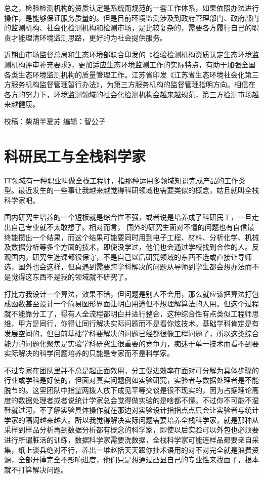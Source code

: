 \documentclass[]{book}
\begin{document}
总之，检验检测机构的资质认定是系统而规范的一套工作体系，如果依照办法进行操作，是能够保证服务质量的。但是目前环境监测涉及到政府管理部门、政府部门的监测机构、社会化检测机构和检测市场，是比较复杂的，需要各方履行自己的职责才能理清环境监测思路，更好的为社会提供服务。

近期由市场监督总局和生态环境部联合印发的《检验检测机构资质认定生态环境监测机构评审补充要求》，更加适应生态环境监测工作的实际特点，有助于加强全国各类生态环境监测机构的质量管理工作。江苏省印发《江苏省生态环境社会化第三方服务机构监督管理暂行办法》，为第三方服务机构的监督管理指明方向。相信在各方的努力下，环境监测领域的社会化检测机构会越来越规范，第三方检测市场越来越健康。

校稿：柴胡半夏苏
编辑：智公子

\hypertarget{ux79d1ux7814ux6c11ux5de5ux4e0eux5168ux6808ux79d1ux5b66ux5bb6}{%
\section{科研民工与全栈科学家}\label{ux79d1ux7814ux6c11ux5de5ux4e0eux5168ux6808ux79d1ux5b66ux5bb6}}

IT领域有一种职业叫做全栈工程师，指那种运用多领域知识完成产品的工作类型。最近发生的一些事让我越来越觉得科研领域也需要类似的概念，姑且就叫全栈科学家吧。

国内研究生培养的一个短板就是综合性不强，或者说是培养成了科研民工，一旦走出自己专业就不太敢想了。相对而言， 国外的研究生面对不懂的问题也有自信最终能攒出一个结果，而这个结果可能要同时用到电子工程、材料、分析化学、机械及数据分析等多个方面的技术，即使没学过，他们也会通过学校找到合作的人。反观国内，研究生选课都很保守，不是自己以后研究领域的东西不选或直接让导师选，国外也会这样，但真遇到需要跨学科解决的问题从导师到学生都会想办法而不是觉得这东西不是我的领域就不研究了。

打比方我设计一个算法，效果不错，但问题是别人不会用，那么就应该把算法打包成函数甚至设计一个简易图形界面让明白用途但不想理解算法的人用。但这个过程就不能靠分工了，得有人全流程都明白并进行整合，这种综合性有点类似工程师思维，甲方是同行，你得让同行解决实际问题而不是看你炫技术。基础学科肯定是有发展空间的，但目前基础学科要解决的问题已经都很像工程问题了，所以这类综合能力的问题化聚焦是实验学科研究生很重要的竞争力，痴迷于单一技术而看不到要实际解决的科学问题培养的只能是专家而不是科学家。

不过专家在团队里并不总是起正面效用，分工促进效率在面对可分解为具体步骤的行业或学科是好使的，但面对真实问题例如实验研究，实验者与数据处理者是不能脱节的。这里团队中指望两拨人放下成见平等交谈是很不现实的，因为占据理论高度的数据处理者或者说统计学家总会觉得做实验的是啥都不懂。不过你不可能不湿鞋就过河，不了解实验具体操作就在那边对实验设计指指点点只会让实验者与统计学家的隔阂越来越大。所以我觉得解决实际问题需要培养全栈科学家，就是那种从采样到样品分析再到数据分析都有概念的科学家，即使以后实验可以外包也必须要进行所谓脏活的训练，数据科学家需要洗数据，全栈科学家可能连样品都要亲自采集，纸上谈兵绝对不行，养出一堆赵括天天跟你扯术语用的对不对完全就是浪费资源，全部开掉完全不影响进度，他们只是想通过凸显自己的专业性来找面子，根本就不打算解决问题。
\end{document}
